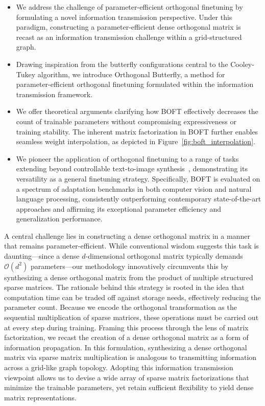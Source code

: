 \begin{itemize}[leftmargin=*,nosep]
    \item We address the challenge of parameter-efficient orthogonal finetuning by formulating a novel information transmission perspective. Under this paradigm, constructing a parameter-efficient dense orthogonal matrix is recast as an information transmission challenge within a grid-structured graph.
    \item Drawing inspiration from the butterfly configurations central to the Cooley-Tukey algorithm, we introduce Orthogonal Butterfly, a method for parameter-efficient orthogonal finetuning formulated within the information transmission framework.
    \item We offer theoretical arguments clarifying how BOFT effectively decreases the count of trainable parameters without compromising expressiveness or training stability. The inherent matrix factorization in BOFT further enables seamless weight interpolation, as depicted in Figure~\ref{fig:boft_interpolation}.
    \item We pioneer the application of orthogonal finetuning to a range of tasks extending beyond controllable text-to-image synthesis~\cite{qiu2023controlling}, demonstrating its versatility as a general finetuning strategy. Specifically, BOFT is evaluated on a spectrum of adaptation benchmarks in both computer vision and natural language processing, consistently outperforming contemporary state-of-the-art approaches and affirming its exceptional parameter efficiency and generalization performance.
\end{itemize}

A central challenge lies in constructing a dense orthogonal matrix in a manner that remains parameter-efficient. While conventional wisdom suggests this task is daunting—since a dense $d$-dimensional orthogonal matrix typically demands $\mathcal{O}(d^2)$ parameters—our methodology innovatively circumvents this by synthesizing a dense orthogonal matrix from the product of multiple structured sparse matrices. The rationale behind this strategy is rooted in the idea that computation time can be traded off against storage needs, effectively reducing the parameter count. Because we encode the orthogonal transformation as the sequential multiplication of sparse matrices, these operations must be carried out at every step during training. Framing this process through the lens of matrix factorization, we recast the creation of a dense orthogonal matrix as a form of information propagation. In this formulation, synthesizing a dense orthogonal matrix via sparse matrix multiplication is analogous to transmitting information across a grid-like graph topology. Adopting this information transmission viewpoint allows us to devise a wide array of sparse matrix factorizations that minimize the trainable parameters, yet retain sufficient flexibility to yield dense matrix representations.



